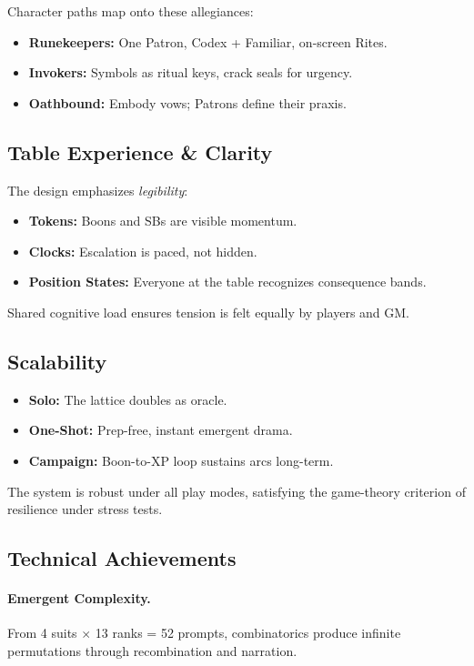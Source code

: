 Character paths map onto these allegiances:
\begin{itemize}
  \item \textbf{Runekeepers:} One Patron, Codex + Familiar, on-screen Rites.
  \item \textbf{Invokers:} Symbols as ritual keys, crack seals for urgency.
  \item \textbf{Oathbound:} Embody vows; Patrons define their praxis.
\end{itemize}

\subsection{Table Experience \& Clarity}

The design emphasizes \emph{legibility}:
\begin{itemize}
  \item \textbf{Tokens:} Boons and SBs are visible momentum.
  \item \textbf{Clocks:} Escalation is paced, not hidden.
  \item \textbf{Position States:} Everyone at the table recognizes consequence bands.
\end{itemize}

Shared cognitive load ensures tension is felt equally by players and GM.

\subsection{Scalability}

\begin{itemize}
  \item \textbf{Solo:} The lattice doubles as oracle.  
  \item \textbf{One-Shot:} Prep-free, instant emergent drama.  
  \item \textbf{Campaign:} Boon-to-XP loop sustains arcs long-term.  
\end{itemize}

The system is robust under all play modes, satisfying the game-theory criterion of resilience under stress tests.

\subsection{Technical Achievements}

\paragraph{Emergent Complexity.}
From 4 suits $\times$ 13 ranks = 52 prompts, combinatorics produce infinite permutations through recombination and narration.

